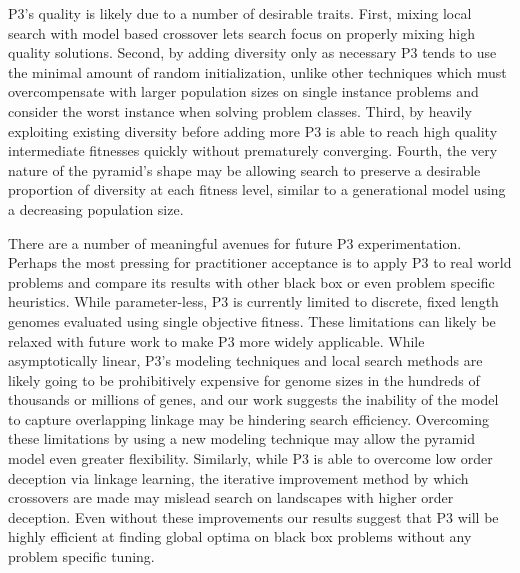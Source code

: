 \documentclass[twoside]{article}
\begin{document}
P3's quality is likely due to a number of desirable traits. First, mixing local search with model based
crossover lets search focus on properly mixing high quality solutions. Second, by adding diversity only
as necessary P3 tends to use the minimal amount of random initialization, unlike other techniques which must
overcompensate with larger population sizes on single instance problems and consider the worst instance
when solving problem classes. Third, by heavily exploiting existing diversity before adding more P3 is able
to reach high quality intermediate fitnesses quickly without prematurely converging. Fourth, the very
nature of the pyramid's shape may be allowing search to preserve a desirable proportion of diversity at
each fitness level, similar to a generational model using a decreasing population size.

There are a number of meaningful avenues for future P3 experimentation. Perhaps the most
pressing for practitioner acceptance is to apply P3 to real world problems and compare
its results with other black box or even problem specific heuristics. While parameter-less,
P3 is currently limited to discrete, fixed length genomes evaluated using single objective
fitness. These limitations can likely be relaxed with future work to make P3 more widely applicable.
While asymptotically linear, P3's modeling techniques and local search methods are likely going
to be prohibitively expensive for genome sizes in the hundreds of thousands or millions of genes,
and our work suggests the inability of the model to capture overlapping linkage may be hindering
search efficiency. Overcoming these limitations by using a new modeling technique may allow
the pyramid model even greater flexibility. Similarly, while P3 is able to overcome low
order deception via linkage learning, the iterative improvement method by which crossovers
are made may mislead search on landscapes with higher order deception. Even without
these improvements our results suggest that P3 will be highly efficient at finding
global optima on black box problems without any problem specific tuning.

\small



\end{document}
